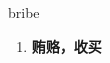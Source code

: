 
\begin{frame}
{\huge bribe}
\begin{center}
\begin{enumerate}\Large
  \item \textbf{贿赂，收买}
\end{enumerate}
\end{center}
\end{frame}
